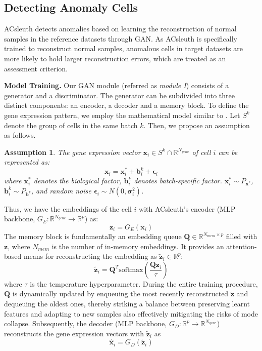 \documentclass{article}
\newtheorem{assumption}{Assumption}[section]
\begin{document}
\subsection{Detecting Anomaly Cells}
ACsleuth detects anomalies based on learning the reconstruction of normal samples in the reference datasets through GAN. 
As ACsleuth is specifically trained to reconstruct normal samples, 
anomalous cells in target datasets are more likely to hold larger reconstruction errors, 
which are treated as an assessment criterion. 

\textbf{Model Training.}
Our GAN module (referred as \textit{module I}) consists of a generator and a discriminator. 
The generator can be subdivided into three distinct components: an encoder, a decoder and a memory block.
To define the gene expression pattern, we employ the mathematical model similar to \cite{hornung2016combining}.
Let $S^k$ denote the group of cells in the same batch $k$.
Then, we propose an assumption as follows.
\begin{assumption}\label{as:pattern}
    The gene expression vector $\bm{x}_i \in S^k \cap \mathbb{R}^{N_{gene}}$ of cell $i$ can be represented as:
    \begin{equation}\label{eq:pattern}
        \bm{x}_i = \bm{x}_i^* + \bm{b}_i^k + \bm{\epsilon}_i
    \end{equation}
    where $\bm{x}_i^*$ denotes the biological factor, $\bm{b}_i^k$ denotes batch-specific factor.
    $\bm{x}_i^* \sim P_{\bm{x}^*}$, $\bm{b}_i^k \sim P_{\bm{b}^k}$, and random noise $\bm{\epsilon}_i\sim N(0, \bm{\sigma}_i^2)$.
\end{assumption}
Thus, we have the embeddings of the cell $i$ with ACsleuth's encoder (MLP backbone, $G_E:\mathbb{R}^{N_{gene}} \rightarrow \mathbb{R}^p$) as:
\begin{equation}
    \bm{z}_i = G_E(\bm{x}_i)
\end{equation}
The memory block is fundamentally an embedding queue $\bm{Q}\in\mathbb{R}^{N_{mem}\times p}$ 
filled with $\bm{z}$, where $N_{mem}$ is the number of in-memory embeddings.
It provides an attention-based means for reconstructing the embedding as $\widetilde{\bm{z}}_i \in \mathbb{R}^p$: 
\begin{equation}
    \widetilde{\bm{z}}_i = \bm{Q}^T \text{softmax}\left(\frac{\bm{Q}\bm{z}_i}{\tau}\right)
\end{equation}
where $\tau$ is the temperature hyperparameter.
During the entire training procedure, $\bm{Q}$ is dynamically updated by enqueuing the most recently 
reconstructed $\widetilde{\bm{z}}$ and dequeuing the oldest ones, thereby striking 
a balance between preserving learnt features and adapting to new samples also 
effectively mitigating the risks of mode collapse. 
Subsequently, the decoder (MLP backbone, $G_D:\mathbb{R}^p \rightarrow \mathbb{R}^{N_{gene}}$) reconstructs the gene expression vectors 
with $\widetilde{\bm{z}}_i$ as
\begin{equation}
    \widehat{\bm{x}}_i = G_D(\widetilde{\bm{z}}_i)
\end{equation}
\end{document}
